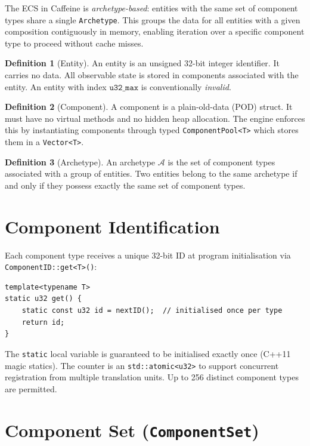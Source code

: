 \documentclass[12pt, a4paper]{report}
\theoremstyle{definition}
\newtheorem{definition}{Definition}[section]
\theoremstyle{remark}
\begin{document}
The ECS in Caffeine is \emph{archetype-based}: entities with the same
set of component types share a single \texttt{Archetype}. This groups
the data for all entities with a given composition contiguously in memory,
enabling iteration over a specific component type to proceed without cache
misses.

\begin{definition}[Entity]
An entity is an unsigned 32-bit integer identifier. It carries no data.
All observable state is stored in components associated with the entity.
An entity with index $\texttt{u32\_max}$ is conventionally \emph{invalid}.
\end{definition}

\begin{definition}[Component]
A component is a plain-old-data (POD) struct. It must have no virtual
methods and no hidden heap allocation. The engine enforces this by
instantiating components through typed \texttt{ComponentPool<T>} which
stores them in a \texttt{Vector<T>}.
\end{definition}

\begin{definition}[Archetype]
An archetype $\mathcal{A}$ is the set of component types associated with a
group of entities. Two entities belong to the same archetype if and only if
they possess exactly the same set of component types.
\end{definition}

\section{Component Identification}

Each component type receives a unique 32-bit ID at program initialisation
via \texttt{ComponentID::get<T>()}:

\begin{lstlisting}[caption={Type-ID registration}]
template<typename T>
static u32 get() {
    static const u32 id = nextID();  // initialised once per type
    return id;
}
\end{lstlisting}

The \texttt{static} local variable is guaranteed to be initialised exactly
once (C++11 magic statics). The counter is an \texttt{std::atomic<u32>}
to support concurrent registration from multiple translation units.
Up to 256 distinct component types are permitted.

\section{Component Set (\texttt{ComponentSet})}
\end{document}
